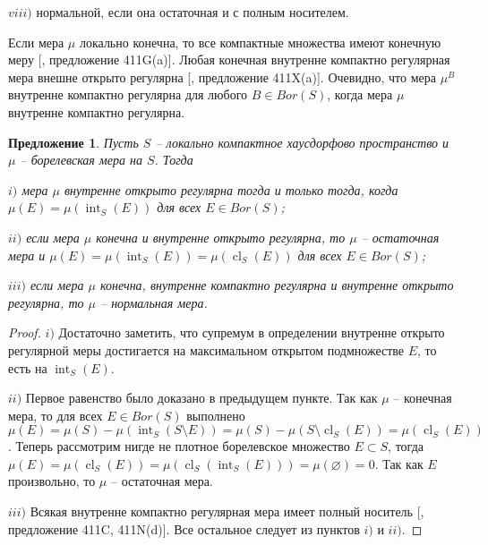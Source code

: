 \documentclass[12pt]{article}
\newtheorem{proposition}[theorem]{Предложение}
\begin{document}
$viii)$ нормальной, если она остаточная и с полным носителем.

Если мера $\mu$ локально конечна, то все компактные множества имеют конечную меру [\cite{FremMeasTh4.1}, предложение 411G(a)]. Любая конечная внутренне компактно регулярная мера внешне открыто регулярна [\cite{FremMeasTh4.1}, предложение 411X(a)]. Очевидно, что мера $\mu^B$ внутренне компактно регулярна для любого $B\in Bor(S)$, когда мера $\mu$ внутренне компактно регулярна.

\begin{proposition}\label{InnerOpenRegMeasCharac} Пусть $S$ -- локально компактное хаусдорфово пространство и $\mu$ -- борелевская мера на $S$. Тогда

    $i)$ мера $\mu$ внутренне открыто регулярна тогда и только тогда, когда $\mu(E)=\mu(\operatorname{int}_S(E))$ для всех $E\in Bor(S)$;

    $ii)$ если мера $\mu$ конечна и внутренне открыто регулярна, то $\mu$ -- остаточная мера и $\mu(E)=\mu(\operatorname{int}_S(E))=\mu(\operatorname{cl}_S(E))$ для всех $E\in Bor(S)$;

    $iii)$ если мера $\mu$ конечна, внутренне компактно регулярна и внутренне открыто регулярна, то $\mu$ -- нормальная мера.
\end{proposition}
\begin{proof} $i)$ Достаточно заметить, что супремум в определении внутренне открыто регулярной меры достигается на максимальном открытом подмножестве $E$, то есть на $\operatorname{int}_S(E)$.

    $ii)$ Первое равенство было доказано в предыдущем пункте. Так как $\mu$ -- конечная мера, то для всех $E\in Bor(S)$ выполнено $\mu(E)=\mu(S)-\mu(\operatorname{int}_S(S\setminus E))=\mu(S)-\mu(S\setminus \operatorname{cl}_S(E))=\mu(\operatorname{cl}_S(E))$. Теперь рассмотрим нигде не плотное борелевское множество $E\subset S$, тогда $\mu(E)=\mu(\operatorname{cl}_S(E))=\mu(\operatorname{cl}_S(\operatorname{int}_S(E)))=\mu(\varnothing)=0$. Так как $E$ произвольно, то $\mu$ -- остаточная мера.

    $iii)$ Всякая внутренне компактно регулярная мера имеет полный носитель [\cite{FremMeasTh4.1}, предложение 411C, 411N(d)]. Все остальное следует из пунктов $i)$ и $ii)$.
\end{proof}
\end{document}
